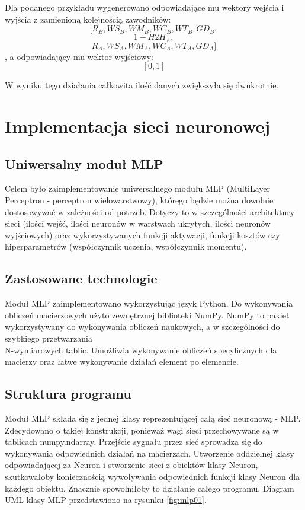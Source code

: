 Dla podanego przykładu wygenerowano odpowiadające mu wektory wejścia i wyjścia z zamienioną kolejnością zawodników:
$$[R_B, WS_B, WM_B, WC_B, WT_B, GD_B,$$
$$1-H2H_A,$$  
$$R_A, WS_A, WM_A, WC_A, WT_A, GD_A]$$
, a odpowiadający mu wektor wyjściowy: $$[0, 1]$$

W wyniku tego działania całkowita ilość danych zwiększyła się dwukrotnie.

\chapter{Implementacja sieci neuronowej}
\section{Uniwersalny moduł MLP}
\label{Sec:MLPMod}

Celem było zaimplementowanie uniwersalnego modułu MLP (MultiLayer Perceptron - perceptron wielowarstwowy), którego będzie można dowolnie dostosowywać w zależności od potrzeb. Dotyczy to w szczególności architektury sieci (ilości wejść, ilości neuronów w warstwach ukrytych, ilości neuronów wyjściowych) oraz wykorzystywanych funkcji aktywacji, funkcji kosztów czy hiperparametrów (współczynnik uczenia, współczynnik momentu).

\section{Zastosowane technologie}
\label{Sec:MLPTech}
Moduł MLP zaimplementowano wykorzystując język Python. Do wykonywania obliczeń macierzowych użyto zewnętrznej biblioteki NumPy. NumPy to pakiet wykorzystywany do wykonywania obliczeń naukowych, a w szczególności do szybkiego przetwarzania \\ N-wymiarowych tablic. Umożliwia wykonywanie obliczeń specyficznych dla macierzy oraz łatwe wykonywanie działań element po elemencie.


\section{Struktura programu}
\label{Sec:MLPStruct}
Moduł MLP składa się z jednej klasy reprezentującej całą sieć neuronową - MLP. Zdecydowano o takiej konstrukcji, ponieważ wagi sieci przechowywane są w tablicach numpy.ndarray. Przejście sygnału przez sieć sprowadza się do wykonywania odpowiednich działań na macierzach. Utworzenie oddzielnej klasy odpowiadającej za Neuron i stworzenie sieci z obiektów klasy Neuron, skutkowałoby koniecznością wywoływania odpowiednich funkcji klasy Neuron dla każdego obiektu. Znacznie spowolniłoby to działanie całego programu. Diagram UML klasy MLP przedstawiono na rysunku \ref{fig:mlp01}.

